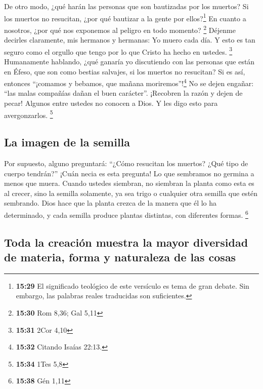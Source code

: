  De otro modo, ¿qué harán las personas que son bautizadas
por los muertos? Si los muertos no resucitan, ¿por qué bautizar a la
gente por ellos?\footnote{\textbf{15:29} El significado teológico de
  este versículo es tema de gran debate. Sin embargo, las palabras
  reales traducidas son suficientes.}  En cuanto a
nosotros, ¿por qué nos exponemos al peligro en todo momento? \footnote{\textbf{15:30}
  Rom 8,36; Gal 5,11}  Déjenme decirles claramente, mis
hermanos y hermanas: Yo muero cada día. Y esto es tan seguro como el
orgullo que tengo por lo que Cristo ha hecho en ustedes. \footnote{\textbf{15:31}
  2Cor 4,10}  Humanamente hablando, ¿qué ganaría yo
discutiendo con las personas que están en Éfeso, que son como bestias
salvajes, si los muertos no resucitan? Si es así, entonces ``¡comamos y
bebamos, que mañana moriremos''!\footnote{\textbf{15:32} Citando Isaías
  22:13.}  No se dejen engañar: ``las malas compañías
dañan el buen carácter''.  ¡Recobren la razón y dejen de
pecar! Algunos entre ustedes no conocen a Dios. Y les digo esto para
avergonzarlos. \footnote{\textbf{15:34} 1Tes 5,8}

\hypertarget{la-imagen-de-la-semilla}{%
\subsection{La imagen de la semilla}\label{la-imagen-de-la-semilla}}

 Por supuesto, alguno preguntará: ``¿Cómo resucitan los
muertos? ¿Qué tipo de cuerpo tendrán?''  ¡Cuán necia es
esta pregunta! Lo que sembramos no germina a menos que muera.
 Cuando ustedes siembran, no siembran la planta como esta
es al crecer, sino la semilla solamente, ya sea trigo o cualquier otra
semilla que estén sembrando.  Dios hace que la planta
crezca de la manera que él lo ha determinado, y cada semilla produce
plantas distintas, con diferentes formas. \footnote{\textbf{15:38} Gén
  1,11}

\hypertarget{toda-la-creaciuxf3n-muestra-la-mayor-diversidad-de-materia-forma-y-naturaleza-de-las-cosas}{%
\subsection{Toda la creación muestra la mayor diversidad de materia,
forma y naturaleza de las
cosas}\label{toda-la-creaciuxf3n-muestra-la-mayor-diversidad-de-materia-forma-y-naturaleza-de-las-cosas}}

